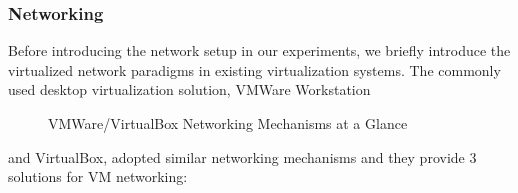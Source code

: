\documentclass[journal,comsoc]{IEEEtran}
\begin{document}
\subsubsection{Networking}
Before introducing the network setup in our experiments, we briefly introduce the virtualized network paradigms in existing virtualization systems. The commonly used desktop virtualization solution, VMWare Workstation\cite{vmworkstation} 

\begin{figure}
  \centering
  \caption{VMWare/VirtualBox Networking Mechanisms at a Glance}
  \label{vmware_net} %
\end{figure}

\noindent and VirtualBox\cite{vbox}, adopted similar networking mechanisms and they provide 3 solutions for VM networking:
\end{document}
